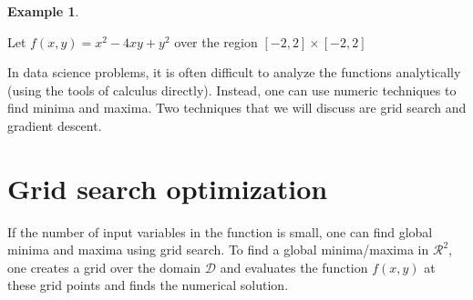 \documentclass[
]{book}
\theoremstyle{definition}
\theoremstyle{definition}
\newtheorem{example}{Example}[chapter]
\theoremstyle{definition}
\theoremstyle{remark}
\begin{document}
\begin{example}
\protect\hypertarget{exm:unlabeled-div-228}{}\label{exm:unlabeled-div-228}

Let \(f(x, y) = x^2 - 4xy + y^2\) over the region \([-2,2]\times[-2, 2]\)

\end{example}

In data science problems, it is often difficult to analyze the functions analytically (using the tools of calculus directly). Instead, one can use numeric techniques to find minima and maxima. Two techniques that we will discuss are grid search and gradient descent.

\hypertarget{grid-search-optimization}{%
\section{Grid search optimization}\label{grid-search-optimization}}

If the number of input variables in the function is small, one can find global minima and maxima using grid search. To find a global minima/maxima in \(\mathcal{R}^2\), one creates a grid over the domain \(\mathcal{D}\) and evaluates the function \(f(x, y)\) at these grid points and finds the numerical solution.
\end{document}
